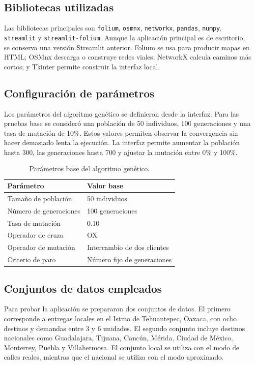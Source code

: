 \documentclass[runningheads]{llncs}
\begin{document}
\subsection{Bibliotecas utilizadas}

Las bibliotecas principales son \texttt{folium}, \texttt{osmnx},
\texttt{networkx}, \texttt{pandas}, \texttt{numpy}, \texttt{streamlit} y
\texttt{streamlit-folium}. Aunque la aplicaci\'on principal es de escritorio, se
conserva una versi\'on Streamlit anterior. Folium se usa para producir mapas en
HTML; OSMnx descarga o construye redes viales; NetworkX calcula caminos m\'as
cortos; y Tkinter permite construir la interfaz local.

\subsection{Configuraci\'on de par\'ametros}

Los par\'ametros del algoritmo gen\'etico se definieron desde la interfaz. Para
las pruebas base se consider\'o una poblaci\'on de 50 individuos, 100 generaciones
y una tasa de mutaci\'on de 10\%. Estos valores permiten observar la convergencia
sin hacer demasiado lenta la ejecuci\'on. La interfaz permite aumentar la
poblaci\'on hasta 300, las generaciones hasta 700 y ajustar la mutaci\'on entre
0\% y 100\%.

\begin{table}
\centering
\caption{Par\'ametros base del algoritmo gen\'etico.}\label{tab:parametros}
\begin{tabular}{ll}
\toprule
Par\'ametro & Valor base \\
\midrule
Tama\~no de poblaci\'on & 50 individuos \\
N\'umero de generaciones & 100 generaciones \\
Tasa de mutaci\'on & 0.10 \\
Operador de cruza & OX \\
Operador de mutaci\'on & Intercambio de dos clientes \\
Criterio de paro & N\'umero fijo de generaciones \\
\bottomrule
\end{tabular}
\end{table}

\subsection{Conjuntos de datos empleados}

Para probar la aplicaci\'on se prepararon dos conjuntos de datos. El primero
corresponde a entregas locales en el Istmo de Tehuantepec, Oaxaca, con ocho
destinos y demandas entre 3 y 6 unidades. El segundo conjunto incluye destinos
nacionales como Guadalajara, Tijuana, Canc\'un, M\'erida, Ciudad de M\'exico,
Monterrey, Puebla y Villahermosa. El conjunto local se utiliza con el modo de
calles reales, mientras que el nacional se utiliza con el modo aproximado.
\end{document}
